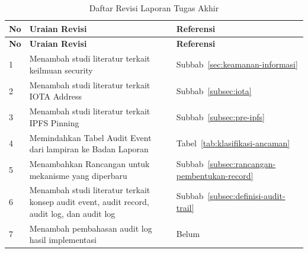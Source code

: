 \begin{xltabular}{\textwidth}{
    |>{\centering\arraybackslash}p{0.6cm}
    |X
    |>{\centering\arraybackslash}p{3.2cm}|}

\caption{Daftar Revisi Laporan Tugas Akhir}
\label{tab:riwayat-revisi}\\

\hline
\textbf{No} &
\textbf{Uraian Revisi} &
\textbf{Referensi} \\
\hline
\endfirsthead

\hline
\textbf{No} &
\textbf{Uraian Revisi} &
\textbf{Referensi} \\
\hline
\endhead

\hline
\endfoot

\hline
\endlastfoot

1 &
Menambah studi literatur terkait keilmuan security &
Subbab~\ref{sec:keamanan-informasi} \\
\hline

2 &
Menambah studi literatur terkait IOTA Address &
Subbab~\ref{subsec:iota} \\
\hline

3 &
Menambah studi literatur terkait IPFS Pinning &
Subbab~\ref{subsec:pre-ipfs} \\
\hline

4 &
Memindahkan Tabel Audit Event dari lampiran ke Badan Laporan  &
Tabel~\ref{tab:klasifikasi-ancaman} \\
\hline

5 &
Menambahkan Rancangan untuk mekanisme yang diperbaru  &
Subbab~\ref{subsec:rancangan-pembentukan-record} \\
\hline

6 &
Menambah studi literatur terkait konsep audit event, audit record, audit log, dan audit log  &
Subbab~\ref{subsec:definisi-audit-trail} \\
\hline

7 &
Menambah pembahasan audit log hasil implementasi  &
Belum \\
\hline

\end{xltabular}

\clearpage
